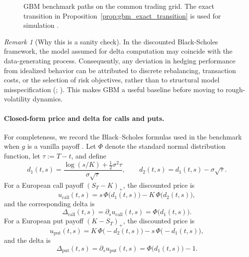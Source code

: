 \documentclass[12pt,a4paper]{article}
\theoremstyle{definition}
\theoremstyle{plain}
\theoremstyle{remark}
\newtheorem{remark}{Remark}[section]
\theoremstyle{plain}
\begin{document}
\begin{figure}[H]
\centering
{}
\caption{GBM benchmark paths on the common trading grid. The exact transition in Proposition~\ref{prop:gbm_exact_transition} is used for simulation \cite{BlackScholes1973}.}
\label{fig:gbm_paths_schematic}
\end{figure}
\FloatBarrier

\begin{remark}[Why this is a sanity check]
\label{rem:gbm_sanity_check}
In the discounted Black-Scholes framework, the model assumed for delta computation may coincide with the data-generating process.
Consequently, any deviation in hedging performance from idealized behavior can be attributed to discrete rebalancing, transaction costs, or the selection of risk objectives, rather than to structural model misspecification (\cite{BlackScholes1973}; \cite{Buehler2019DeepHedging}).
This makes GBM a useful baseline before moving to rough-volatility dynamics.
\end{remark}

\paragraph{Closed-form price and delta for calls and puts.}
For completeness, we record the Black--Scholes formulas used in the benchmark when $g$ is a vanilla payoff \cite{BlackScholes1973}. 
Let $\Phi$ denote the standard normal distribution function, let $\tau:=T-t$, and define
\[
d_1(t,s)=\frac{\log(s/K)+\tfrac12\sigma^2\tau}{\sigma\sqrt{\tau}},
\qquad
d_2(t,s)=d_1(t,s)-\sigma\sqrt{\tau}.
\]
For a European call payoff $(S_T-K)_+$, the discounted price is
\[
u_{\mathrm{call}}(t,s)=s\,\Phi\!\bigl(d_1(t,s)\bigr)-K\,\Phi\!\bigl(d_2(t,s)\bigr),
\]
and the corresponding delta is
\[
\Delta_{\mathrm{call}}(t,s)=\partial_s u_{\mathrm{call}}(t,s)=\Phi\!\bigl(d_1(t,s)\bigr).
\]
For a European put payoff $(K-S_T)_+$, the discounted price is
\[
u_{\mathrm{put}}(t,s)=K\,\Phi\!\bigl(-d_2(t,s)\bigr)-s\,\Phi\!\bigl(-d_1(t,s)\bigr),
\]
and the delta is
\[
\Delta_{\mathrm{put}}(t,s)=\partial_s u_{\mathrm{put}}(t,s)=\Phi\!\bigl(d_1(t,s)\bigr)-1.
\]
\end{document}
